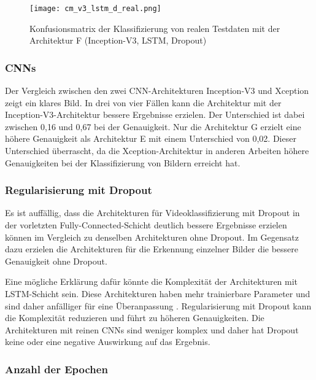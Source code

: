 \begin{figure}[h]
\centering
{\texttt{[image: cm\_v3\_lstm\_d\_real.png]}}
\caption{Konfusionsmatrix der Klassifizierung von realen Testdaten mit der Architektur F (Inception-V3, \ac{LSTM}, Dropout)}
\label{fig_cm_v3_lstm_d_real}
\end{figure}

\subsubsection{\aclp{CNN}}

Der Vergleich zwischen den zwei \ac{CNN}-Architekturen Inception-V3 und Xception zeigt ein klares Bild. In drei von vier Fällen kann die Architektur mit der Inception-V3-Architektur bessere Ergebnisse erzielen. Der Unterschied ist dabei zwischen 0,16 und 0,67 bei der Genauigkeit. Nur die Architektur G erzielt eine höhere Genauigkeit als Architektur E mit einem Unterschied von 0,02. Dieser Unterschied überrascht, da die Xception-Architektur in anderen Arbeiten \cite{chollet2017xception} höhere Genauigkeiten bei der Klassifizierung von Bildern erreicht hat.

\subsubsection{Regularisierung mit Dropout}

Es ist auffällig, dass die Architekturen für Videoklassifizierung mit Dropout in der vorletzten Fully-Connected-Schicht deutlich bessere Ergebnisse erzielen können im Vergleich zu denselben Architekturen ohne Dropout. Im Gegensatz dazu erzielen die Architekturen für die Erkennung einzelner Bilder die bessere Genauigkeit ohne Dropout.

Eine mögliche Erklärung dafür könnte die Komplexität der Architekturen mit \ac{LSTM}-Schicht sein. Diese Architekturen haben mehr trainierbare Parameter und sind daher anfälliger für eine Überanpassung \cite{hinton2012improving}. Regularisierung mit Dropout kann die Komplexität reduzieren und führt zu höheren Genauigkeiten. Die Architekturen mit reinen \acp{CNN} sind weniger komplex und daher hat Dropout keine oder eine negative Auswirkung auf das Ergebnis.

\subsubsection{Anzahl der Epochen}

